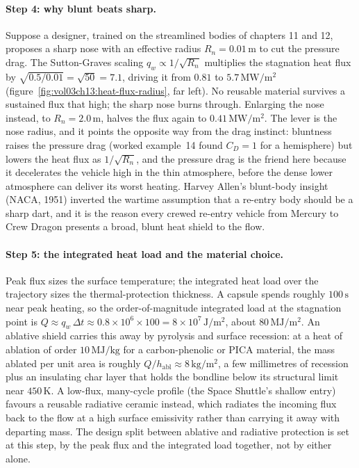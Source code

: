 \paragraph{Step 4: why blunt beats sharp.} Suppose a designer, trained
on the streamlined bodies of chapters 11 and 12, proposes a sharp nose
with an effective radius $R_n = 0.01\,\si{\meter}$ to cut the pressure
drag. The Sutton-Graves scaling $q_w \propto 1/\sqrt{R_n}$ multiplies
the stagnation heat flux by $\sqrt{0.5/0.01} = \sqrt{50} = 7.1$,
driving it from $0.81$ to $5.7\,\si{\mega\watt\per\meter\squared}$
(figure~\ref{fig:vol03ch13:heat-flux-radius}, far left). No reusable
material survives a sustained flux that high; the sharp nose burns
through. Enlarging the nose instead, to $R_n = 2.0\,\si{\meter}$, halves
the flux again to $0.41\,\si{\mega\watt\per\meter\squared}$. The lever
is the nose radius, and it points the opposite way from the drag
instinct: bluntness raises the pressure drag (worked example~14 found
$C_D = 1$ for a hemisphere) but lowers the heat flux as
$1/\sqrt{R_n}$, and the pressure drag is the friend here because it
decelerates the vehicle high in the thin atmosphere, before the dense
lower atmosphere can deliver its worst heating. Harvey Allen's
blunt-body insight (NACA, 1951) inverted the wartime assumption that a
re-entry body should be a sharp dart, and it is the reason every crewed
re-entry vehicle from Mercury to Crew Dragon presents a broad, blunt
heat shield to the flow.





\paragraph{Step 5: the integrated heat load and the material choice.}
Peak flux sizes the surface temperature; the integrated heat load over
the trajectory sizes the thermal-protection thickness. A capsule spends
roughly $100\,\si{\second}$ near peak heating, so the order-of-magnitude
integrated load at the stagnation point is
$Q \approx q_w\,\Delta t \approx 0.8\times 10^{6}\times 100 =
8\times 10^{7}\,\si{\joule\per\meter\squared}$, about
$80\,\si{\mega\joule\per\meter\squared}$. An ablative shield carries
this away by pyrolysis and surface recession: at a heat of ablation of
order $10\,\si{\mega\joule\per\kilogram}$ for a carbon-phenolic or PICA
material, the mass ablated per unit area is roughly
$Q/h_{\text{abl}} \approx 8\,\si{\kilogram\per\meter\squared}$, a few
millimetres of recession plus an insulating char layer that holds the
bondline below its structural limit near $450\,\si{\kelvin}$. A
low-flux, many-cycle profile (the Space Shuttle's shallow entry) favours
a reusable radiative ceramic instead, which radiates the incoming flux
back to the flow at a high surface emissivity rather than carrying it
away with departing mass. The design split between ablative and
radiative protection is set at this step, by the peak flux and the
integrated load together, not by either alone.

